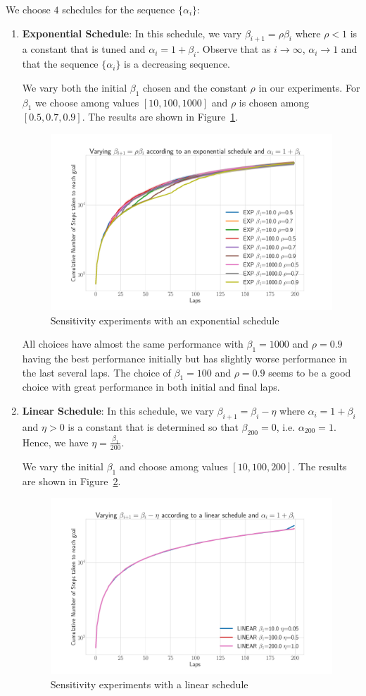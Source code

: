 We choose $4$ schedules for the sequence $\{\alpha_i\}$:
\begin{enumerate}
\item \textbf{Exponential Schedule}: In this schedule, we vary
  $\beta_{i+1} = \rho\beta_i$ where $\rho < 1$ is a constant that is
  tuned and $\alpha_i = 1 + \beta_i$. Observe that as $i\rightarrow
  \infty$, $\alpha_i \rightarrow 1$ and that the sequence
  $\{\alpha_i\}$ is a decreasing sequence.

  We vary both the initial $\beta_1$ chosen and the constant $\rho$ in
  our experiments. For $\beta_1$ we choose among values $[10, 100,
  1000]$ and $\rho$ is chosen among $[0.5, 0.7, 0.9]$. The results are
  shown in Figure~\ref{fig:exp}.
  \begin{figure}
  \centering
  \includegraphics[width=0.5\linewidth]{figures/cmaxpp/alpha_exp.pdf}
  \caption{Sensitivity experiments with an exponential schedule}
  \label{fig:exp}
\end{figure}

All choices have almost the same performance with $\beta_1 = 1000$ and
$\rho = 0.9$ having the best performance initially but has slightly
worse performance in the last several laps. The choice of $\beta_1 =
100$ and $\rho = 0.9$  seems to be a good choice with great performance in both
initial and final laps.

\item \textbf{Linear Schedule}: In this schedule, we vary $\beta_{i+1}
  = \beta_i - \eta$ where $\alpha_i = 1 + \beta_i$ and $\eta > 0$ is a
  constant that is determined
  so that $\beta_{200} = 0$, i.e. $\alpha_{200} = 1$. Hence, we have
  $\eta = \frac{\beta_1}{200}$.

  We vary the initial $\beta_1$ and choose among values $[10, 100,
  200]$. The results are shown in Figure~\ref{fig:linear}.
  \begin{figure}
  \centering
  \includegraphics[width=0.5\linewidth]{figures/cmaxpp/alpha_linear.pdf}
  \caption{Sensitivity experiments with a linear schedule}
  \label{fig:linear}
\end{figure}


\end{enumerate}
